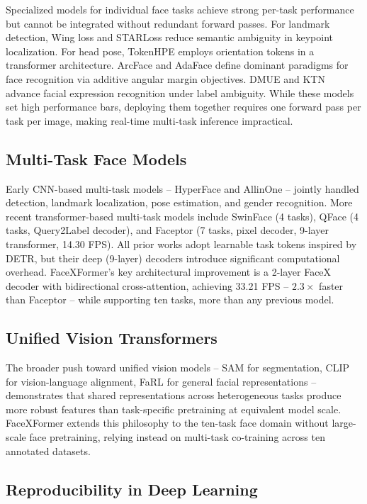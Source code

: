 \documentclass[11pt]{article}
\begin{document}
Specialized models for individual face tasks achieve strong per-task performance but cannot be integrated without redundant forward passes. For landmark detection, Wing loss and STARLoss reduce semantic ambiguity in keypoint localization. For head pose, TokenHPE employs orientation tokens in a transformer architecture. ArcFace and AdaFace define dominant paradigms for face recognition via additive angular margin objectives. DMUE and KTN advance facial expression recognition under label ambiguity. While these models set high performance bars, deploying them together requires one forward pass per task per image, making real-time multi-task inference impractical.



\subsection{Multi-Task Face Models}

Early CNN-based multi-task models -- HyperFace and AllinOne -- jointly handled detection, landmark localization, pose estimation, and gender recognition. More recent transformer-based multi-task models include SwinFace (4 tasks), QFace (4 tasks, Query2Label decoder), and Faceptor (7 tasks, pixel decoder, 9-layer transformer, 14.30 FPS). All prior works adopt learnable task tokens inspired by DETR, but their deep (9-layer) decoders introduce significant computational overhead. FaceXFormer's key architectural improvement is a 2-layer FaceX decoder with bidirectional cross-attention, achieving 33.21 FPS -- $2.3\times$ faster than Faceptor -- while supporting ten tasks, more than any previous model.



\subsection{Unified Vision Transformers}

The broader push toward unified vision models -- SAM for segmentation, CLIP for vision-language alignment, FaRL for general facial representations -- demonstrates that shared representations across heterogeneous tasks produce more robust features than task-specific pretraining at equivalent model scale. FaceXFormer extends this philosophy to the ten-task face domain without large-scale face pretraining, relying instead on multi-task co-training across ten annotated datasets.



\subsection{Reproducibility in Deep Learning}
\end{document}
